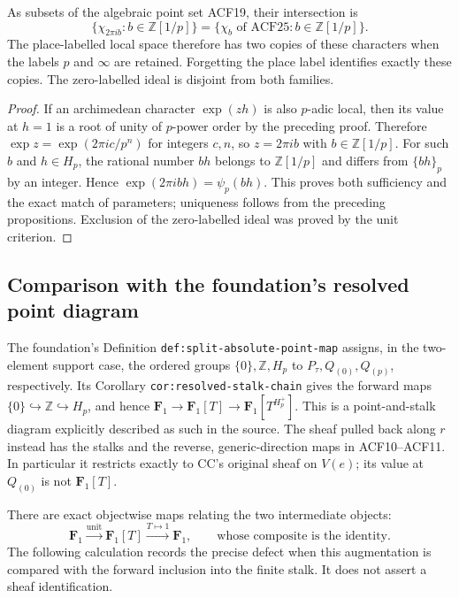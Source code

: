 \begin{proposition}
As subsets of the algebraic point set ACF19, their intersection is
\begin{equation}\tag{ACF26}
 \{\chi_{2\pi i b}:b\in\mathbb Z[1/p]\}
  =\{\chi_b\text{ of ACF25}:b\in\mathbb Z[1/p]\}.
\end{equation}
The place-labelled local space therefore has two copies of these
characters when the labels $p$ and $\infty$ are retained. Forgetting
the place label identifies exactly these copies. The zero-labelled
ideal is disjoint from both families.
\end{proposition}
\begin{proof}
If an archimedean character $\exp(zh)$ is also $p$-adic local, then its
value at $h=1$ is a root of unity of $p$-power order by the preceding
proof. Therefore $\exp z=\exp(2\pi i c/p^n)$ for integers $c,n$, so
$z=2\pi i b$ with $b\in\mathbb Z[1/p]$.
For such $b$ and $h\in H_p$, the rational number $bh$ belongs to
$\mathbb Z[1/p]$ and differs from $\{bh\}_p$ by an integer. Hence
$\exp(2\pi i b h)=\psi_p(bh)$. This proves both sufficiency and the
exact match of parameters; uniqueness follows from the preceding
propositions. Exclusion of the zero-labelled ideal was proved by the
unit criterion.
\end{proof}

\subsection{Comparison with the foundation's resolved point diagram}
The foundation's Definition \texttt{def:\allowbreak split-\allowbreak absolute-\allowbreak point-\allowbreak map}
assigns, in the two-element support case, the ordered groups
$\{0\},\mathbb Z,H_p$ to $P_\tau,Q_{(0)},Q_{(p)}$, respectively.
Its Corollary \texttt{cor:\allowbreak resolved-\allowbreak stalk-\allowbreak chain} gives the forward maps
$\{0\}\hookrightarrow\mathbb Z\hookrightarrow H_p$, and hence
$\mathbf F_1\to\mathbf F_1[T]\to\mathbf F_1[T^{H_p^+}]$.
This is a point-and-stalk diagram explicitly described as such in the
source. The sheaf pulled back along $r$ instead has the stalks and the
reverse, generic-direction maps in ACF10--ACF11. In particular it
restricts exactly to CC's original sheaf on $V(e)$; its value at
$Q_{(0)}$ is not $\mathbf F_1[T]$.

There are exact objectwise maps relating the two intermediate objects:
\begin{equation}\tag{ACF27}
 \mathbf F_1\xrightarrow{\text{unit}}\mathbf F_1[T]
 \xrightarrow{T\mapsto1}\mathbf F_1,
 \qquad\text{whose composite is the identity.}
\end{equation}
The following calculation records the precise defect when this
augmentation is compared with the forward inclusion into the finite
stalk. It does not assert a sheaf identification.

